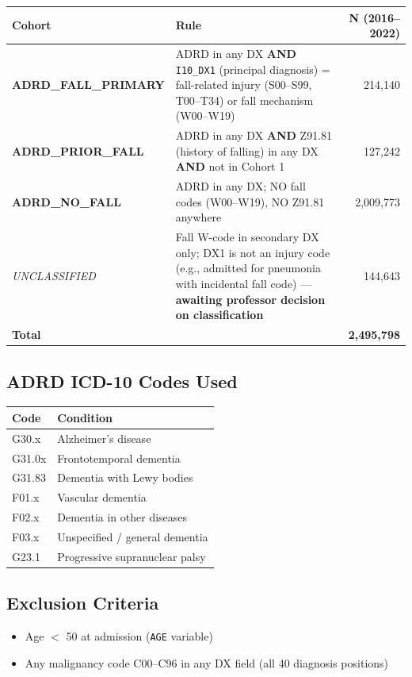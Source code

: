 \documentclass[11pt,letterpaper]{article}
\begin{document}
\begin{center}
\renewcommand{\arraystretch}{1.4}
\begin{tabularx}{\textwidth}{lXr}
\toprule
\textbf{Cohort} & \textbf{Rule} & \textbf{N (2016–2022)} \\
\midrule
\textbf{ADRD\_FALL\_PRIMARY}
  & ADRD in any DX \textbf{AND} \texttt{I10\_DX1} (principal diagnosis) =
    fall-related injury (S00–S99, T00–T34) or fall mechanism (W00–W19)
  & 214,140 \\
\textbf{ADRD\_PRIOR\_FALL}
  & ADRD in any DX \textbf{AND} Z91.81 (history of falling) in any DX
    \textbf{AND} not in Cohort 1
  & 127,242 \\
\textbf{ADRD\_NO\_FALL}
  & ADRD in any DX; NO fall codes (W00–W19), NO Z91.81 anywhere
  & 2,009,773 \\
\midrule
\textit{UNCLASSIFIED}
  & Fall W-code in secondary DX only; DX1 is not an injury code
    (e.g., admitted for pneumonia with incidental fall code) —
    \textbf{awaiting professor decision on classification}
  & 144,643 \\
\midrule
\textbf{Total} & & \textbf{2,495,798} \\
\bottomrule
\end{tabularx}
\end{center}

\subsection{ADRD ICD-10 Codes Used}

\begin{center}
\begin{tabular}{ll}
\toprule
\textbf{Code} & \textbf{Condition} \\
\midrule
G30.x  & Alzheimer's disease \\
G31.0x & Frontotemporal dementia \\
G31.83 & Dementia with Lewy bodies \\
F01.x  & Vascular dementia \\
F02.x  & Dementia in other diseases \\
F03.x  & Unspecified / general dementia \\
G23.1  & Progressive supranuclear palsy \\
\bottomrule
\end{tabular}
\end{center}

\subsection{Exclusion Criteria}
\begin{itemize}
  \item Age $<$ 50 at admission (\texttt{AGE} variable)
  \item Any malignancy code C00–C96 in any DX field (all 40 diagnosis positions)
\end{itemize}
\end{document}
